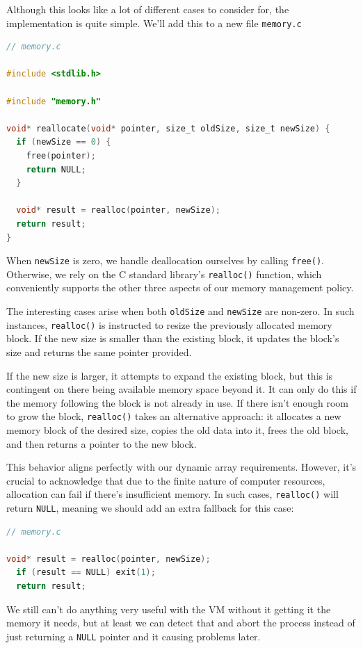 Although this looks like a lot of different cases to consider for, the implementation is quite simple. We'll add this to a new file \verb,memory.c,

\begin{lstlisting}[language=C]
// memory.c

#include <stdlib.h>

#include "memory.h"

void* reallocate(void* pointer, size_t oldSize, size_t newSize) {
  if (newSize == 0) {
    free(pointer);
    return NULL;
  }

  void* result = realloc(pointer, newSize);
  return result;
}
\end{lstlisting}

When \verb.newSize. is zero, we handle deallocation ourselves by calling \verb,free(),. Otherwise, we rely on the C standard library's \verb.realloc(). function, which conveniently supports the other three aspects of our memory management policy.

The interesting cases arise when both \verb.oldSize. and \verb.newSize. are non-zero. In such instances, \verb.realloc(). is instructed to resize the previously allocated memory block. If the new size is smaller than the existing block, it updates the block's size and returns the same pointer provided.

If the new size is larger, it attempts to expand the existing block, but this is contingent on there being available memory space beyond it. It can only do this if the memory following the block is not already in use. If there isn't enough room to grow the block, \verb.realloc(). takes an alternative approach: it allocates a new memory block of the desired size, copies the old data into it, frees the old block, and then returns a pointer to the new block.

This behavior aligns perfectly with our dynamic array requirements. However, it's crucial to acknowledge that due to the finite nature of computer resources, allocation can fail if there's insufficient memory. In such cases, \verb.realloc(). will return \verb.NULL., meaning we should add an extra fallback for this case:

\begin{lstlisting}[language=C]
// memory.c

void* result = realloc(pointer, newSize);
  if (result == NULL) exit(1);
  return result;
\end{lstlisting}

We still can't do anything very useful with the \ac{VM} without it getting it the memory it needs, but at least we can detect that  and abort the process instead of just returning a \verb/NULL/ pointer and it causing problems later.

